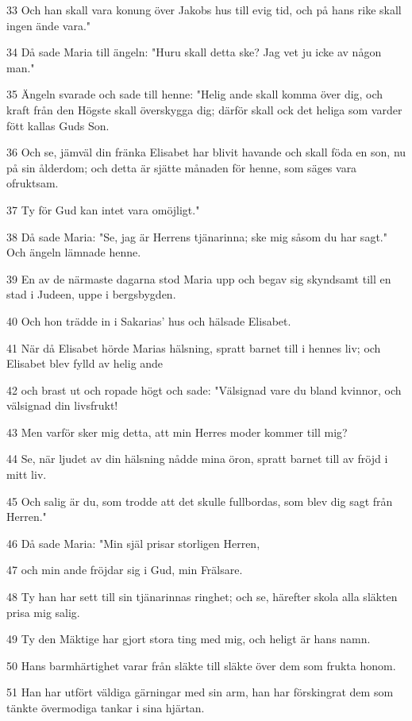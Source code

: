 \par 33 Och han skall vara konung över Jakobs hus till evig tid, och på hans rike skall ingen ände vara."
\par 34 Då sade Maria till ängeln: "Huru skall detta ske? Jag vet ju icke av någon man."
\par 35 Ängeln svarade och sade till henne: "Helig ande skall komma över dig, och kraft från den Högste skall överskygga dig; därför skall ock det heliga som varder fött kallas Guds Son.
\par 36 Och se, jämväl din fränka Elisabet har blivit havande och skall föda en son, nu på sin ålderdom; och detta är sjätte månaden för henne, som säges vara ofruktsam.
\par 37 Ty för Gud kan intet vara omöjligt."
\par 38 Då sade Maria: "Se, jag är Herrens tjänarinna; ske mig såsom du har sagt." Och ängeln lämnade henne.
\par 39 En av de närmaste dagarna stod Maria upp och begav sig skyndsamt till en stad i Judeen, uppe i bergsbygden.
\par 40 Och hon trädde in i Sakarias' hus och hälsade Elisabet.
\par 41 När då Elisabet hörde Marias hälsning, spratt barnet till i hennes liv; och Elisabet blev fylld av helig ande
\par 42 och brast ut och ropade högt och sade: "Välsignad vare du bland kvinnor, och välsignad din livsfrukt!
\par 43 Men varför sker mig detta, att min Herres moder kommer till mig?
\par 44 Se, när ljudet av din hälsning nådde mina öron, spratt barnet till av fröjd i mitt liv.
\par 45 Och salig är du, som trodde att det skulle fullbordas, som blev dig sagt från Herren."
\par 46 Då sade Maria: "Min själ prisar storligen Herren,
\par 47 och min ande fröjdar sig i Gud, min Frälsare.
\par 48 Ty han har sett till sin tjänarinnas ringhet; och se, härefter skola alla släkten prisa mig salig.
\par 49 Ty den Mäktige har gjort stora ting med mig, och heligt är hans namn.
\par 50 Hans barmhärtighet varar från släkte till släkte över dem som frukta honom.
\par 51 Han har utfört väldiga gärningar med sin arm, han har förskingrat dem som tänkte övermodiga tankar i sina hjärtan.
